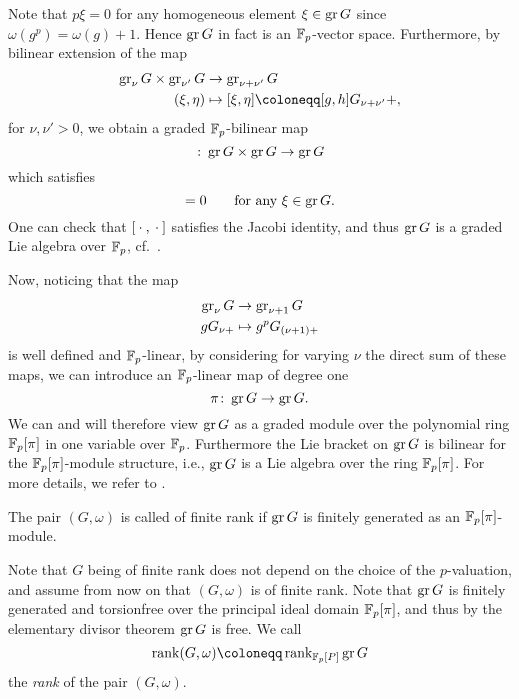Note that $p\xi = 0$ for any homogeneous element $\xi \in \operatorname{gr} G$ since $\omega(g^{p}) = \omega(g) + 1$. Hence $\operatorname{gr} G$ in fact is an $\mathbb{F}_p$-vector space. Furthermore, by bilinear extension of the map
\begin{align*}
  \gr_\nu G \times \gr_{\nu'} G &\to \gr_{\nu+\nu'} G \\
  (\xi,\eta) &\mapsto [\xi,\eta]\coloneqq [g,h]G_{\nu+\nu'}+,
\end{align*}
for $\nu,\nu'>0$, we obtain a graded $\mathbb{F}_p$-bilinear map
\begin{equation*}
  [\edot,\edot] \colon \gr G \times \gr G \to \gr G
\end{equation*}
which satisfies
\begin{equation*}
  [\xi,\xi]=0 \qquad \text{for any }\xi\in\gr G.
\end{equation*}
One can check that $[\:\cdot\:,\:\cdot\:]$ satisfies the Jacobi identity, and thus $\operatorname{gr} G$ is a graded Lie algebra over $\mathbb{F}_p$, cf.\ \cite[Sect.~23]{Sch}.

Now, noticing that the map
\begin{align*}
  \operatorname{gr}_{\nu} G &\to \operatorname{gr}_{\nu+1} G \\
  gG_{\nu+} &\mapsto g^pG_{(\nu+1)+}
\end{align*}
is well defined and $\mathbb{F}_p$-linear, by considering for varying $\nu$ the direct sum of these maps, we can introduce an $\mathbb{F}_p$-linear map of degree one
\begin{equation*}
  \pi \colon \operatorname{gr} G \to \operatorname{gr} G.
\end{equation*}%
%
We can and will therefore view $\operatorname{gr} G$ as a graded module over the polynomial ring $\mathbb{F}_p[\pi]$ in one variable over $\mathbb{F}_p$. Furthermore the Lie bracket on $\operatorname{gr} G$ is bilinear for the $\mathbb{F}_p[\pi]$-module structure, i.e., $\operatorname{gr} G$ is a Lie algebra over the ring $\mathbb{F}_p[\pi]$. For more details, we refer to \cite[Sect.~25]{Sch}.
\begin{definition}
  The pair $(G,\omega)$ is called of finite rank if $\operatorname{gr} G$ is finitely generated as an $\mathbb{F}_p[\pi]$-module.
\end{definition}
Note that $G$ being of finite rank does not depend on the choice of the $p$-valuation, and assume from now on that $(G,\omega)$ is of finite rank. Note that $\operatorname{gr} G$ is finitely generated and torsionfree over the principal ideal domain $\mathbb{F}_{p}[\pi]$, and thus by the elementary divisor theorem  $\operatorname{gr} G$ is free. We call
\begin{equation*}
  \rank(G,\omega) \coloneqq \rank_{\F_p[P]} \gr G
\end{equation*}%
%
the \emph{rank} of the pair $(G,\omega)$.

